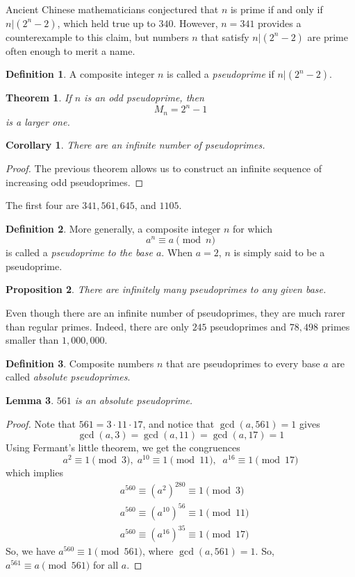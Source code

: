 \documentclass{article}
\newtheorem{theorem}{Theorem}[section]
\newtheorem{proposition}[theorem]{Proposition}
\newtheorem{lemma}[theorem]{Lemma}
\newtheorem{corollary}{Corollary}[theorem]
\theoremstyle{remark}
\theoremstyle{definition}
\newtheorem{definition}{Definition}[section]
\begin{document}
Ancient Chinese mathematicians conjectured that $n$ is prime if and only if $n|(2^n - 2)$, which held true up to $340$. However, $n = 341$ provides a counterexample to this claim, but numbers $n$ that satisfy $n | (2^n - 2)$ are prime often enough to merit a name. 

\begin{definition}
A composite integer $n$ is called a \textit{pseudoprime} if $n | (2^n - 2)$. 
\end{definition}

\begin{theorem}
If $n$ is an odd pseudoprime, then 
\[M_n = 2^n -1\]
is a larger one. 
\end{theorem}

\begin{corollary}
There are an infinite number of pseudoprimes. 
\end{corollary}
\begin{proof}
The previous theorem allows us to construct an infinite sequence of increasing odd pseudoprimes. 
\end{proof}
The first four are $341, 561, 645$, and $1105$. 

\begin{definition}
More generally, a composite integer $n$ for which 
\[a^n \equiv a \pmod{n}\]
is called a \textit{pseudoprime to the base $a$}. When $a=2$, $n$ is simply said to be a pseudoprime. 
\end{definition}

\begin{proposition}
There are infinitely many pseudoprimes to any given base. 
\end{proposition}
Even though there are an infinite number of pseudoprimes, they are much rarer than regular primes. Indeed, there are only $245$ pseudoprimes and $78,498$ primes smaller than $1,000,000$.

\begin{definition}
Composite numbers $n$ that are pseudoprimes to every base $a$ are called \textit{absolute pseudoprimes}. 
\end{definition}

\begin{lemma}
$561$ is an absolute pseudoprime. 
\end{lemma}
\begin{proof}
Note that $561 = 3 \cdot 11 \cdot 17$, and notice that $\gcd(a, 561) = 1$ gives 
\[\gcd(a, 3) = \gcd(a, 11) = \gcd(a, 17) = 1\]
Using Fermant's little theorem, we get the congruences
\[a^2 \equiv 1 \pmod{3}, \; a^{10} \equiv 1 \pmod{11}, \;\; a^{16} \equiv 1 \pmod{17}\]
which implies 
\begin{align*}
    &a^{560} \equiv (a^2)^{280} \equiv 1 \pmod{3} \\
    &a^{560} \equiv (a^{10})^{56} \equiv 1 \pmod{11} \\
    &a^{560} \equiv (a^{16})^{35} \equiv 1 \pmod{17} 
\end{align*}
So, we have $a^{560} \equiv 1 \pmod{561}$, where $\gcd(a, 561) =1$. So, $a^{561} \equiv a \pmod{561}$ for all $a$. 
\end{proof}
\end{document}
